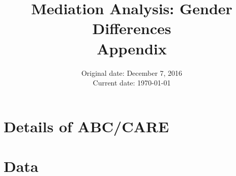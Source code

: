 








\title{Mediation Analysis: Gender Differences \\ Appendix}
\date{Original date: December 7, 2016 \\ Current date: \today}
\maketitle

\tableofcontents

\doublespacing

\clearpage

\begin{appendix}

\section{Details of ABC/CARE}
\label{app:program}
	

\section{Data}
\label{app:data}
	

\end{appendix}

\clearpage
\singlespacing




